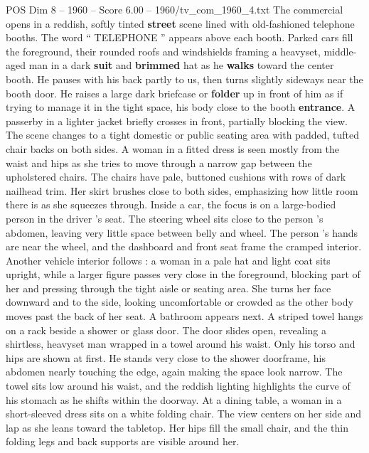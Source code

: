 \begin{textsample}{POS Dim 8 – 1960 – Score 6.00 – 1960/tv\_com\_1960\_4.txt}  \label{ex:f8_pos_084}
The commercial opens in a reddish, softly tinted \textbf{street} scene lined with old-fashioned telephone booths.
The word “ TELEPHONE ” appears above each booth.
Parked cars fill the foreground, their rounded roofs and windshields framing a heavyset, middle-aged man in a dark \textbf{suit} and \textbf{brimmed} hat as he \textbf{walks} toward the center booth.
He pauses with his back partly to us, then turns slightly sideways near the booth door.
He raises a large dark briefcase or \textbf{folder} up in front of him as if trying to manage it in the tight space, his body close to the booth \textbf{entrance}.
A passerby in a lighter jacket briefly crosses in front, partially blocking the view.
The scene changes to a tight domestic or public seating area with padded, tufted chair backs on both sides.
A woman in a fitted dress is seen mostly from the waist and hips as she tries to move through a narrow gap between the upholstered chairs.
The chairs have pale, buttoned cushions with rows of dark nailhead trim.
Her skirt brushes close to both sides, emphasizing how little room there is as she squeezes through.
Inside a car, the focus is on a large-bodied person in the driver ’s seat.
The steering wheel sits close to the person ’s abdomen, leaving very little space between belly and wheel.
The person ’s hands are near the wheel, and the dashboard and front seat frame the cramped interior.
Another vehicle interior follows : a woman in a pale hat and light coat sits upright, while a larger figure passes very close in the foreground, blocking part of her and pressing through the tight aisle or seating area.
She turns her face downward and to the side, looking uncomfortable or crowded as the other body moves past the back of her seat.
A bathroom appears next.
A striped towel hangs on a rack beside a shower or glass door.
The door slides open, revealing a shirtless, heavyset man wrapped in a towel around his waist.
Only his torso and hips are shown at first.
He stands very close to the shower doorframe, his abdomen nearly touching the edge, again making the space look narrow.
The towel sits low around his waist, and the reddish lighting highlights the curve of his stomach as he shifts within the doorway.
At a dining table, a woman in a short-sleeved dress sits on a white folding chair.
The view centers on her side and lap as she leans toward the tabletop.
Her hips fill the small chair, and the thin folding legs and back supports are visible around her.

\end{textsample}
